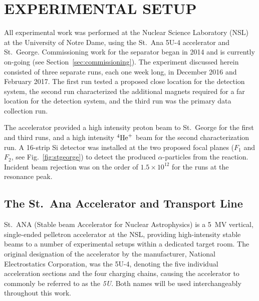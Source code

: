 \chapter{EXPERIMENTAL SETUP}
\label{ch:02-experimental-setup}

All experimental work was performed at the Nuclear Science Laboratory
(NSL) at the University of Notre Dame, using the St.\ Ana 5U-4
accelerator and St.\ George. Commissioning work for the separator began
in 2014 and is currently on-going (see Section~\ref{sec:commissioning}).
The experiment discussed herein consisted of three separate runs, each
one week long, in December 2016 and February 2017. The first run tested
a proposed close location for the detection system, the second run
characterized the additional magnets required for a far location for the
detection system, and the third run was the primary data collection run.

The accelerator provided a high intensity proton beam to St.\ George for
the first and third runs, and a high intensity ${}^{4}\textrm{He}^{+}$ beam
for the second characterization run. A 16-strip Si detector was
installed at the two proposed focal planes ($F_1$ and $F_2$, see
Fig.~\ref{fig:stgeorge}) to detect the produced $\alpha$-particles from
the \alpa{} reaction. Incident beam rejection was on the order of
$1.5\times 10^{12}$ for the runs at the resonance peak.


\section{The St.\ Ana Accelerator and Transport Line}
\label{sec:ch02-5U}

St.\ ANA (Stable beam Accelerator for Nuclear Astrophysics) is a 5~MV
vertical, single-ended pelletron accelerator at the NSL, providing
high-intensity stable beams to a number of experimental setups within a
dedicated target room. The original designation of the accelerator by
the manufacturer, National Electrostatics Corporation, was the 5U-4,
denoting the five individual acceleration sections and the four charging
chains, causing the accelerator to commonly be referred to as the
\textit{5U}. Both names will be used interchangeably throughout this
work.

